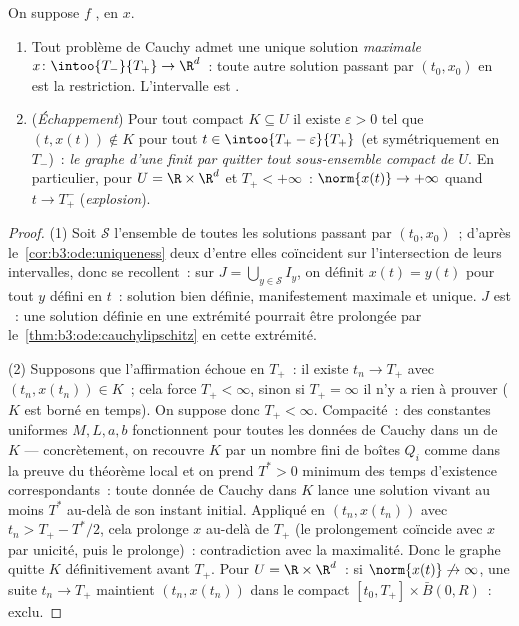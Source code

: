 \begin{theorem}
\label{thm:b3:ode:maximal}
On suppose $f$ ,  en $x$.
\begin{enumerate}
  \item Tout problème de Cauchy admet une unique solution
        \emph{maximale} $x \colon \intoo{T_-}{T_+} \to \R^d$~:
        toute autre solution passant par $(t_0, x_0)$ en est
        la restriction. L'intervalle est .
  \item (\emph{Échappement}) Pour tout compact
        $K \subseteq U$ il existe $\varepsilon > 0$ tel que
        $(t, x(t)) \notin K$ pour tout
        $t \in \intoo{T_+ - \varepsilon}{T_+}$ (et
        symétriquement en $T_-$)~: \emph{le graphe d'une
         finit par quitter tout sous-ensemble
        compact de $U$}. En particulier, pour
        $U = \R\times\R^d$ et $T_+ < +\infty$~:
        $\norm{x(t)} \to +\infty$ quand $t \to T_+^-$
        (\emph{explosion}).
\end{enumerate}
\end{theorem}

\begin{proof}
(1) Soit $\mathcal S$ l'ensemble de toutes les solutions
passant par $(t_0, x_0)$~; d'après
le~\cref{cor:b3:ode:uniqueness} deux d'entre elles coïncident
sur l'intersection de leurs intervalles, donc se recollent~:
sur $J = \bigcup_{y \in \mathcal S}I_y$, on définit
$x(t) = y(t)$ pour tout $y$ défini en $t$~: solution bien
définie, manifestement maximale et unique. $J$ est ~: une
solution définie en une extrémité pourrait être prolongée par
le~\cref{thm:b3:ode:cauchylipschitz} en cette extrémité.

(2) Supposons que l'affirmation échoue en $T_+$~: il existe
$t_n \to T_+$ avec $(t_n, x(t_n)) \in K$~; cela force
$T_+ < \infty$, sinon si $T_+ = \infty$ il n'y a rien à
prouver ($K$ est borné en temps). On suppose donc
$T_+ < \infty$. Compacité~: des constantes uniformes
$M, L, a, b$ fonctionnent pour toutes les données de Cauchy
dans un  de $K$ --- concrètement, on recouvre $K$
par un nombre fini de boîtes $Q_i$ comme dans la preuve du
théorème local et on prend $T^* > 0$ minimum des temps
d'existence correspondants~: toute donnée de Cauchy dans $K$
lance une solution vivant au moins $T^*$ au-delà de son
instant initial. Appliqué en $(t_n, x(t_n))$ avec
$t_n > T_+ - T^*/2$, cela prolonge $x$ au-delà de $T_+$ (le
prolongement coïncide avec $x$ par unicité, puis le
prolonge)~: contradiction avec la maximalité. Donc le graphe
quitte $K$ définitivement avant $T_+$. Pour
$U = \R\times\R^d$~: si $\norm{x(t)}\not\to\infty$, une suite
$t_n \to T_+$ maintient $(t_n, x(t_n))$ dans le compact
$[t_0, T_+]\times\bar B(0, R)$~: exclu.
\end{proof}

